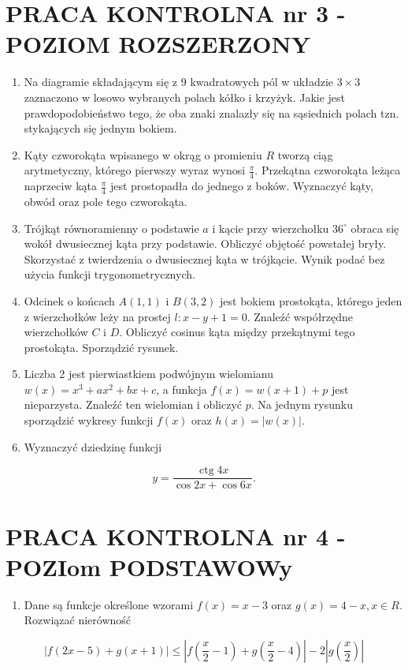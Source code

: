 \documentclass[10pt]{article}
\begin{document}
\section*{PRACA KONTROLNA nr 3 -POZIOM ROZSZERZONY}
\begin{enumerate}
  \item Na diagramie składającym się z 9 kwadratowych pól w układzie $3 \times 3$ zaznaczono w losowo wybranych polach kółko i krzyżyk. Jakie jest prawdopodobieństwo tego, że oba znaki znalazły się na sąsiednich polach tzn. stykających się jednym bokiem.
  \item Kąty czworokąta wpisanego w okrąg o promieniu $R$ tworzą ciąg arytmetyczny, którego pierwszy wyraz wynosi $\frac{\pi}{4}$. Przekątna czworokąta leżąca naprzeciw kąta $\frac{\pi}{4}$ jest prostopadła do jednego z boków. Wyznaczyć kąty, obwód oraz pole tego czworokąta.
  \item Trójkąt równoramienny o podstawie $a$ i kącie przy wierzchołku $36^{\circ}$ obraca się wokół dwusiecznej kąta przy podstawie. Obliczyć objętość powstałej bryły. Skorzystać z twierdzenia o dwusiecznej kąta w trójkącie. Wynik podać bez użycia funkcji trygonometrycznych.
  \item Odcinek o końcach $A(1,1)$ i $B(3,2)$ jest bokiem prostokąta, którego jeden z wierzchołków leży na prostej $l: x-y+1=0$. Znaleźć współrzędne wierzchołków $C$ i $D$. Obliczyć cosinus kąta między przekątnymi tego prostokąta. Sporządzić rysunek.
  \item Liczba 2 jest pierwiastkiem podwójnym wielomianu $w(x)=x^{3}+a x^{2}+b x+c$, a funkcja $f(x)=w(x+1)+p$ jest nieparzysta. Znaleźć ten wielomian i obliczyć $p$. Na jednym rysunku sporządzić wykresy funkcji $f(x)$ oraz $h(x)=|w(x)|$.
  \item Wyznaczyć dziedzinę funkcji
\end{enumerate}

$$
y=\frac{\operatorname{ctg} 4 x}{\cos 2 x+\cos 6 x} .
$$

\section*{PRACA KONTROLNA nr 4 - POZIom PODSTAWOWy}
\begin{enumerate}
  \item Dane są funkcje określone wzorami $f(x)=x-3$ oraz $g(x)=4-x, x \in R$. Rozwiązać nierówność
\end{enumerate}

$$
|f(2 x-5)+g(x+1)| \leqslant\left|f\left(\frac{x}{2}-1\right)+g\left(\frac{x}{2}-4\right)\right|-2\left|g\left(\frac{x}{2}\right)\right|
$$
\end{document}
